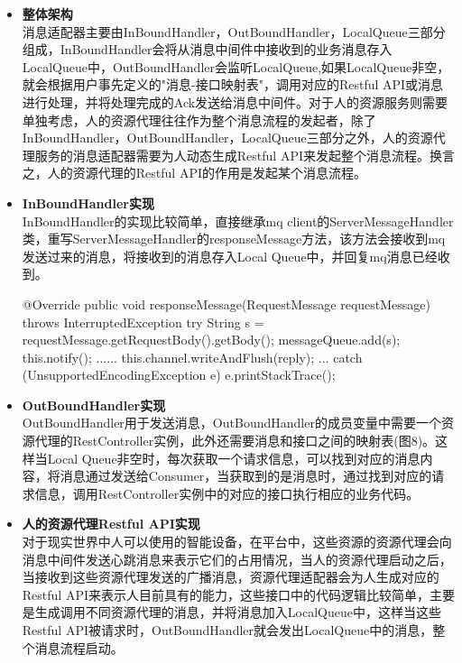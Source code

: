 \documentclass[a4paper, 12pt]{article}
\theoremstyle{definition}
\begin{document}
\begin{itemize}
    \item {\textbf{整体架构}}\\
    消息适配器主要由InBoundHandler，OutBoundHandler，LocalQueue三部分组成，InBoundHandler会将从消息中间件中接收到的业务消息存入LocalQueue中，OutBoundHandler会监听LocalQueue,如果LocalQueue非空，就会根据用户事先定义的"消息-接口映射表"，调用对应的Restful API或消息进行处理，并将处理完成的Ack发送给消息中间件。对于人的资源服务则需要单独考虑，人的资源代理往往作为整个消息流程的发起者，除了InBoundHandler，OutBoundHandler，LocalQueue三部分之外，人的资源代理服务的消息适配器需要为人动态生成Restful API来发起整个消息流程。换言之，人的资源代理的Restful API的作用是发起某个消息流程。 
    \item {\textbf{InBoundHandler实现}}\\
    InBoundHandler的实现比较简单，直接继承mq
    client的ServerMessageHandler类，重写ServerMessageHandler的responseMessage方法，该方法会接收到mq发送过来的消息，将接收到的消息存入Local Queue中，并回复mq消息已经收到。
    \begin{scala}
   @Override
    public void responseMessage(RequestMessage requestMessage) throws InterruptedException {
        try {
            String s = requestMessage.getRequestBody().getBody();
            messageQueue.add(s);
            this.notify();
            ......
            this.channel.writeAndFlush(reply);
            ...
        } catch (UnsupportedEncodingException e) {
            e.printStackTrace();
        }
    }
\end{scala}

    \item {\textbf{OutBoundHandler实现}}\\
    OutBoundHandler用于发送消息，OutBoundHandler的成员变量中需要一个资源代理的RestController实例，此外还需要消息和接口之间的映射表(图8)。这样当Local Queue非空时，每次获取一个请求信息，可以找到对应的消息内容，将消息通过发送给Consumer，当获取到的是消息时，通过找到对应的请求信息，调用RestController实例中的对应的接口执行相应的业务代码。
    
    \item{\textbf{人的资源代理Restful API实现}}\\
    对于现实世界中人可以使用的智能设备，在平台中，这些资源的资源代理会向消息中间件发送心跳消息来表示它们的占用情况，当人的资源代理启动之后，当接收到这些资源代理发送的广播消息，资源代理适配器会为人生成对应的Restful API来表示人目前具有的能力，这些接口中的代码逻辑比较简单，主要是生成调用不同资源代理的消息，并将消息加入LocalQueue中，这样当这些Restful API被请求时，OutBoundHandler就会发出LocalQueue中的消息，整个消息流程启动。
\end{itemize}
\end{document}
